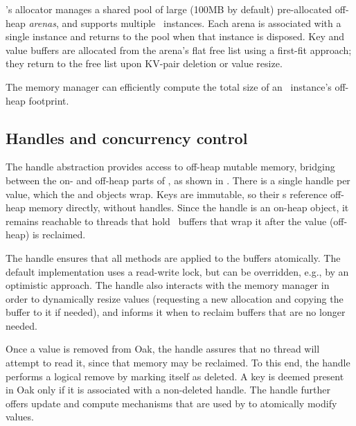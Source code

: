 \oak's allocator manages a shared pool 
of large  (100MB by default) pre-allocated off-heap {\em arenas}, and supports multiple \oak\ instances.  
Each arena is associated with a single \oak\/ instance and returns to the pool when that instance is disposed. 
{Key and value buffers  are allocated from the arena's flat free list 
using a  first-fit approach; they  return to the free list upon KV-pair deletion %
or value resize.}

The memory manager can efficiently compute the total size of an \oak\ instance's  off-heap footprint.


\subsection{Handles and  concurrency control}
\label{ssec:handles}

The handle abstraction provides access to off-heap mutable memory, bridging between the on- and  off-heap parts of \oak,  
as shown in . There is a single handle per value, which the  
 and  objects  wrap. Keys are immutable, so their 
s reference off-heap memory directly, without handles.  
%
Since the handle is an on-heap object, it remains reachable to  threads that hold \oak\ buffers that wrap it 
 after the value  (off-heap) is reclaimed. 



The handle ensures that all methods are applied to the buffers atomically. 
The default implementation uses a read-write lock, but can be overridden, e.g., by an optimistic approach.
The handle also interacts with the memory manager in order to dynamically resize values
(requesting a new allocation and copying the buffer to it if needed), 
and informs it when to reclaim buffers that are no longer needed.

Once a value is removed from Oak, the handle assures that no thread will attempt to read it, since 
that memory may be reclaimed. 
To this end, the handle performs a logical remove by marking itself as deleted.
A key is deemed present in Oak only if it is associated with a non-deleted handle.
% 
The handle further offers 
update and compute mechanisms that are used by \oak\/ to atomically modify values.

